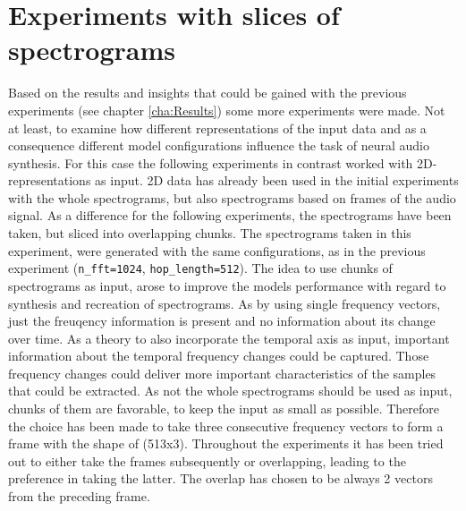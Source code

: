 \section{Experiments with slices of spectrograms}
Based on the results and insights that could be gained with the previous experiments (see chapter \ref{cha:Results}) some more experiments were made. Not at least, to examine how different representations of the input data and as a consequence different model configurations influence the task of neural audio synthesis. For this case the following experiments in contrast worked with 2D-representations as input. 2D data has already been used in the initial experiments with the whole spectrograms, but also spectrograms based on frames of the audio signal. As a difference for the following experiments, the spectrograms have been taken, but sliced into overlapping chunks. The spectrograms taken in this experiment, were generated with the same configurations, as in the previous experiment (\texttt{n\_fft=1024}, \texttt{hop\_length=512}). The idea to use chunks of spectrograms as input, arose to improve the models performance with regard to synthesis and recreation of spectrograms. As by using single frequency vectors, just the freuqency information is present and no information about its change over time. As a theory to also incorporate the temporal axis as input, important information about the temporal frequency changes could be captured. Those frequency changes could deliver more important characteristics of the samples that could be extracted. As not the whole spectrograms should be used as input, chunks of them are favorable, to keep the input as small as possible. Therefore the choice has been made to take three consecutive frequency vectors to form a frame with the shape of (513x3). Throughout the experiments it has been tried out to either take the frames subsequently or overlapping, leading to the preference in taking the latter. The overlap has chosen to be always 2 vectors from the preceding frame. 

